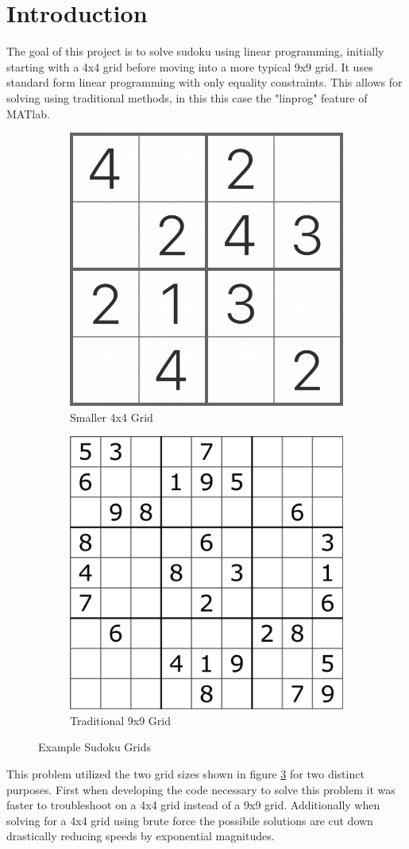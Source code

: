 \documentclass[12pt]{article}
\begin{document}
\section{Introduction}
The goal of this project is to solve sudoku using linear programming, initially starting with a 4x4 grid before
moving into a more typical 9x9 grid. It uses standard form linear programming with only equality constraints. This
allows for solving using traditional methods, in this this case the "linprog" feature of MATlab. 
\begin{figure}
\centering
\begin{subfigure}{.5\textwidth}
  \centering
  \includegraphics[width=.4\linewidth]{4x4}
  \caption{Smaller 4x4 Grid}
  \label{fig:sub1}
\end{subfigure}%
\begin{subfigure}{.5\textwidth}
  \centering
  \includegraphics[width=.4\linewidth]{9x9}
  \caption{Traditional 9x9 Grid}
  \label{fig:sub2}
\end{subfigure}
\caption{Example Sudoku Grids}
\label{fig:sud}
\end{figure}
This problem utilized the two grid sizes shown in figure \ref{fig:sud} for two distinct purposes. First when developing
the code necessary to solve this problem it was faster to troubleshoot on a 4x4 grid instead of a 9x9 grid. Additionally
when solving for a 4x4 grid using brute force the possibile solutions are cut down drastically reducing speeds by exponential
magnitudes.
\\
\end{document}
